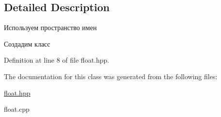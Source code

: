 \subsection{Detailed Description}
Используем пространство имен 

Создадим класс 

Definition at line 8 of file float.\-hpp.



The documentation for this class was generated from the following files\-:\begin{DoxyCompactItemize}
\item 
\hyperlink{float_8hpp}{float.\-hpp}\item 
float.\-cpp\end{DoxyCompactItemize}
